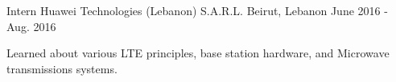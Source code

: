 \begin{cventries}
  \cventry
    {Intern} %
    {Huawei Technologies (Lebanon) S.A.R.L.} %
    {Beirut, Lebanon} %
    {June 2016  - Aug. 2016} %
    {
      \begin{cvitems} %
        \item {Learned about various LTE principles, base station hardware, and Microwave transmissions systems.}
      \end{cvitems}
    }

\end{cventries}
